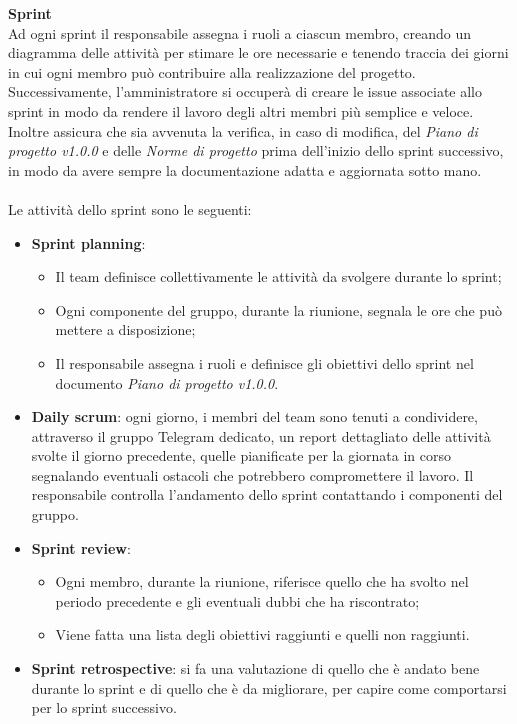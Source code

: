 \noindent \textbf{Sprint} \label{inf:sprint} \\ 
Ad ogni sprint il responsabile
assegna i ruoli a ciascun membro, creando un diagramma delle attività per
stimare le ore necessarie e tenendo traccia dei giorni in cui ogni membro può
contribuire alla realizzazione del progetto. Successivamente, l'amministratore
si occuperà di creare le issue associate allo sprint in modo da rendere il
lavoro degli altri membri più semplice e veloce. Inoltre assicura che sia
avvenuta la verifica, in caso di modifica, del \textit{Piano di progetto v1.0.0} e
delle \textit{Norme di progetto} prima dell'inizio dello sprint successivo, in
modo da avere sempre la documentazione adatta e aggiornata sotto mano.\\\\ Le
attività dello sprint sono le seguenti:
\begin{itemize}
    \item \textbf{Sprint planning}:
          \begin{itemize}
              \item Il team definisce collettivamente le attività da svolgere durante lo sprint;
              \item Ogni componente del gruppo, durante la riunione, segnala le ore che può mettere
                    a disposizione;
              \item Il responsabile assegna i ruoli e definisce gli obiettivi dello sprint nel
                    documento \textit{Piano di progetto v1.0.0}.
          \end{itemize}
    \item \textbf{Daily scrum}: ogni giorno, i membri del team sono tenuti a condividere, attraverso il gruppo Telegram dedicato,
          un report dettagliato delle attività svolte il giorno precedente,
          quelle pianificate per la giornata in corso segnalando eventuali ostacoli che potrebbero compromettere il lavoro.
          Il responsabile controlla l'andamento dello sprint contattando i componenti del gruppo.
    \item \textbf{Sprint review}:
          \begin{itemize}
              \item Ogni membro, durante la riunione, riferisce quello che ha svolto nel periodo
                    precedente e gli eventuali dubbi che ha riscontrato;
              \item Viene fatta una lista degli obiettivi raggiunti e quelli non raggiunti.
          \end{itemize}
    \item \textbf{Sprint retrospective}: si fa una valutazione di quello che è andato bene durante lo sprint e di
          quello che è da migliorare, per capire come comportarsi per lo sprint successivo.
\end{itemize}

